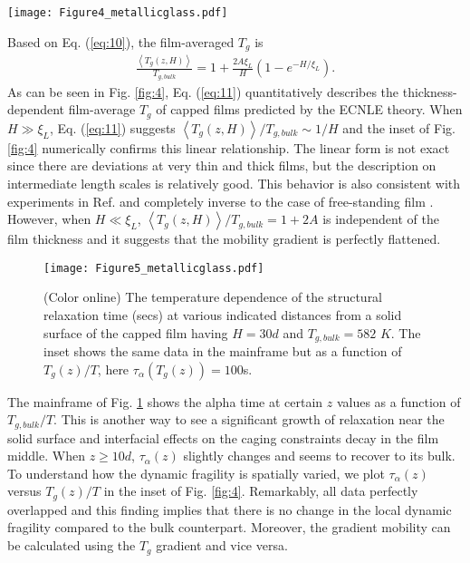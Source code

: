 \documentclass[twocolumn,preprintnumbers,amsmath,amssymb,superscriptaddress]{revtex4}
\begin{document}
\begin{figure*}[htp]
\texttt{[image: Figure4\_metallicglass.pdf]}
\caption{(Color online) The film-averaged $T_g$ normalized by its bulk value as a function of $H/d$ for the 100s vitrification criterion. The solid curve is a fit using Eq. (\ref{eq:11}) with $A =0.145$ and $\xi_L=1.6d$. Inset: same results as in the mainframe plotted versus $d/H$. A straight line is a guide to the eye.}
\label{fig:4}
\end{figure*}

Based on Eq. (\ref{eq:10}), the film-averaged $T_g$ is
\begin{eqnarray}
\frac{\left<T_{g}(z,H)\right>}{T_{g,bulk}}=1+\frac{2A\xi_L}{H}\left(1-e^{-H/\xi_L}\right).
\label{eq:11} 
\end{eqnarray}
As can be seen in Fig. \ref{fig:4}, Eq. (\ref{eq:11}) quantitatively describes the thickness-dependent film-average $T_g$ of capped films predicted by the ECNLE theory. When $H \gg \xi_L$, Eq. (\ref{eq:11}) suggests $\left<T_{g}(z,H)\right>/T_{g,bulk}\sim 1/H$ and the inset of Fig. \ref{fig:4} numerically confirms this linear relationship. The linear form is not exact since there are deviations at very thin and thick films, but the description on intermediate length scales is relatively good. This behavior is also consistent with experiments in Ref. \cite{18} and completely inverse to the case of free-standing film \cite{15,16}. However, when $H \ll \xi_L$, $\left<T_{g}(z,H)\right>/T_{g,bulk}=1+2A$ is independent of the film thickness and it suggests that the mobility gradient is perfectly flattened.

\begin{figure}[htp]
\texttt{[image: Figure5\_metallicglass.pdf]}
\caption{(Color online) The temperature dependence of the structural relaxation time (secs) at various indicated distances from a solid surface of the capped  film having $H = 30d$ and $T_{g,bulk}=582$ $K$. The inset shows the same data in the mainframe but as a function of $T_g(z)/T$, here $\tau_\alpha(T_g(z)) = 100$s.}
\label{fig:5}
\end{figure}

The mainframe of Fig. \ref{fig:5} shows the alpha time at certain $z$ values as a function of $T_{g,bulk}/T$. This is another way to see a significant growth of relaxation near the solid surface and interfacial effects on the caging constraints decay in the film middle. When $z \geq 10d$, $\tau_\alpha(z)$ slightly changes and seems to recover to its bulk. To understand how the dynamic fragility is spatially varied, we plot $\tau_\alpha(z)$ versus $T_g(z)/T$ in the inset of Fig. \ref{fig:4}. Remarkably, all data perfectly overlapped and this finding implies that there is no change in the local dynamic fragility compared to the bulk counterpart. Moreover, the gradient mobility can be calculated using the $T_g$ gradient and vice versa.
\newpage
\end{document}
